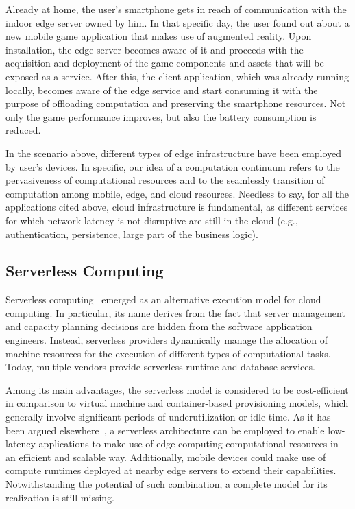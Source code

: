 Already at home, the user's smartphone gets in reach of communication with the indoor edge server owned by him. In that specific day, the user found out about a new mobile game application that makes use of augmented reality. Upon installation, the edge server becomes aware of it and proceeds with the acquisition and deployment of the game components and assets that will be exposed as a service. After this, the client application, which was already running locally, becomes aware of the edge service and start consuming it with the purpose of offloading computation and preserving the smartphone resources. Not only the game performance improves, but also the battery consumption is reduced.  

In the scenario above, different types of edge infrastructure have been employed by user's devices. In specific, our idea of a computation continuum refers to the pervasiveness of computational resources and to the seamlessly transition of computation among mobile, edge, and cloud resources. Needless to say, for all the applications cited above, cloud infrastructure is  fundamental, as different services for which network latency is not disruptive are still in the cloud (e.g., authentication, persistence, large part of the business logic).

\subsection{Serverless Computing}

Serverless computing~\cite{} emerged as an alternative execution model for cloud computing. In particular, its name derives from the fact that server management and capacity planning decisions are hidden from the software application engineers. Instead, serverless providers dynamically manage the allocation of machine resources for the execution of different types of computational tasks. Today, multiple vendors provide serverless runtime and database services. 

Among its main advantages, the serverless model is considered to be cost-efficient in comparison to virtual machine and container-based provisioning models, which generally involve significant periods of underutilization or idle time. As it has been argued elsewhere~\cite{ESOCC'17}, a serverless architecture can be employed to enable low-latency applications to make use of edge computing computational resources in an efficient and scalable way. Additionally, mobile devices could make use of compute runtimes deployed at nearby edge servers to extend their capabilities. Notwithstanding the potential of such combination, a complete model for its realization is still missing. 

